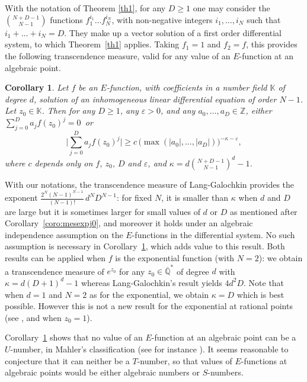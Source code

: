\documentclass[11pt]{article}
\numberwithin{equation}{section}
\newcommand{\Efunction}{$E$\nobreakdash-func\-tion\xspace}
\newcommand{\Efunctions}{$E$\nobreakdash-func\-tions\xspace}
\newtheorem{coro}{Corollary}
\theoremstyle{definition}
\newcommand{\Z}{\mathbb{Z}}
\newcommand{\Qbar}{\overline{\mathbb Q}}
\let\eps\varepsilon
\begin{document}
With the notation of Theorem \ref{th1}, for any $D\geq 1$ one may consider the $\binom{N+D-1}{N-1 }$ functions $f_1^{i_1}\ldots f_N^{i_N}$, with non-negative integers $i_1,\ldots,i_N$ such that $i_1+\ldots+i_N=D$. They make up a vector solution of a first order differential system, to which Theorem~\ref{th1} applies. Taking $f_1=1$ and $f_2=f$, this provides the following transcendence measure, valid for any value of an \Efunction at an algebraic point.

\begin{coro} \label{corotrmes}
Let $f$ be an $E$-function, with coefficients in a number field $\mathbb{K}$ of degree $d$, solution of an inhomogeneous linear differential equation of order $N-1$. Let $z_0 \in \mathbb K$. Then for any $D\geq 1$, any $\eps>0$, and any $a_0,\ldots,a_D\in\Z$, either $\sum_{j=0}^D a_j f(z_0)^j=0$~or\vspace*{-3pt}\enlargethispage{.5\baselineskip}
\[
\bigg| \sum_{j=0}^D a_j f(z_0)^j \bigg| \geq c \, \big( \max( |a_0|,\ldots, |a_D|)\big)^{-\kappa-\eps},
\]
where $c$ depends only on $f$, $z_0$, $D$ and $\eps$, and
$\kappa = d \binom{N+D-1}{N-1} ^d -1$.
\end{coro}
With our notations, the transcendence measure of Lang-Galochkin provides the exponent $\frac{2^{N}(N-1)^{N-1}}{(N-1)!}\,d^{N}D^{N-1}$: for fixed $N$, it is smaller than $\kappa$ when $d$ and $D$ are large but it is sometimes larger for small values of $d$ or $D$ as mentioned after Corollary~\ref{coro:mesexpj0}, and moreover it holds under an algebraic independence assumption on the \Efunctions in the differential system. No such assumption is necessary in Corollary~\ref{corotrmes}, which adds value to this result. Both results can be applied when $f$ is the exponential function (with $N=2$): we obtain a transcendence measure of $e^{z_0}$ for any $z_0\in \Qbar^*$ of degree $d$ with $\kappa = d(D+1)^d-1$ whereas Lang-Galochkin's result yields $4d^2D$. Note that when $d=1$ and $N=2$ as for the exponential, we obtain $\kappa=D$ which is best possible. However this is not a new result for the exponential at rational points (see
\cite[Ch.\,10]{baker}, and \cite[p.\,135, Satz\,3]{mahler} when $z_0=1$).

Corollary~\ref{corotrmes} shows that no value of an \Efunction at an algebraic point can be a $U$-number, in Mahler's classification (see for instance \cite[Ch.\,3]{bugeaud}). It seems reasonable to conjecture that it can neither be a $T$-number, so that values of \Efunctions at algebraic points would be either algebraic numbers or $S$-numbers.
\end{document}
